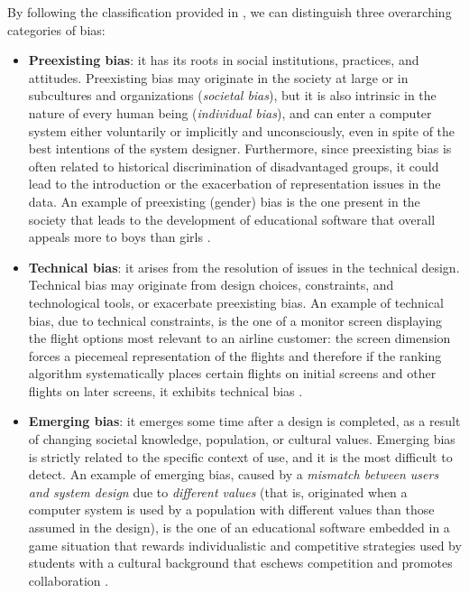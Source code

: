 By following the classification provided in \cite{friedman2017bias}, we can distinguish three overarching categories of bias:
\begin{itemize}
\item \textbf{Preexisting bias}: it has its roots in social institutions, practices, and attitudes. Preexisting bias may originate in the society at large or in subcultures and organizations (\textit{societal bias}), but it is also intrinsic in the nature of every human being (\textit{individual bias}), and can enter a computer system either voluntarily or implicitly and unconsciously, even in spite of the best intentions of the system designer. Furthermore, since preexisting bias is often related to historical discrimination of disadvantaged groups, it could lead to the introduction or the exacerbation of representation issues in the data.
An example of preexisting (gender) bias is the one present in the society that leads to the development of educational software that overall appeals more to boys than girls \cite{friedman2017bias}.
\item \textbf{Technical bias}: it arises from the resolution of issues in the technical design. Technical bias may originate from design choices, constraints, and technological tools, or exacerbate preexisting bias.
An example of technical bias, due to technical constraints, is the one of a monitor screen displaying the flight options most relevant to an airline customer: the screen dimension forces a piecemeal representation of the flights and therefore if the ranking algorithm systematically places certain flights on initial screens and other flights on later screens, it exhibits technical bias \cite{friedman2017bias}.
\item \textbf{Emerging bias}: it emerges some time after a design is completed, as a result of changing societal knowledge, population, or cultural values. Emerging bias is strictly related to the specific context of use, and it is the most difficult to detect.
An example of emerging bias, caused by a \textit{mismatch between users and system design} due to \textit{different values} (that is, originated when a computer system is used by a population with different values than those assumed in the design), is the one of an educational software embedded in a game situation that rewards individualistic and competitive strategies used by students with a cultural background that eschews competition and promotes collaboration \cite{friedman2017bias}.
\end{itemize}

